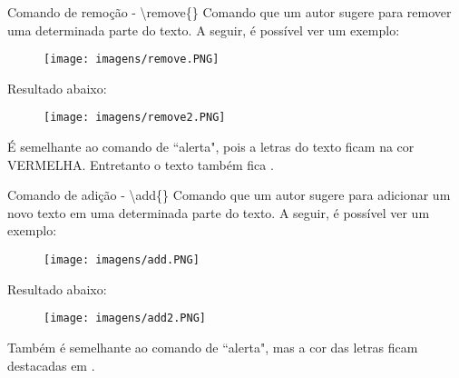 \documentclass[aspectratio=169,smaller]{beamer}
\begin{document}
\begin{frame}{Comando de remoção - \textbackslash remove\{\}}
\justifying
Comando que um autor sugere para remover uma determinada parte do texto. A seguir, é possível ver um exemplo:

\begin{figure}
        \centering
        \texttt{[image: imagens/remove.PNG]}
    \end{figure}

Resultado abaixo:

\begin{figure}
        \centering
        \texttt{[image: imagens/remove2.PNG]}
    \end{figure}

É semelhante ao comando de ``alerta", pois a letras do texto ficam na cor \alert{VERMELHA}. Entretanto o texto também fica .

\end{frame}
\begin{frame}{Comando de adição - \textbackslash add\{\}}
\justifying
Comando que um autor sugere para adicionar um novo texto em uma determinada parte do texto. A seguir, é possível ver um exemplo:

\begin{figure}
        \centering
        \texttt{[image: imagens/add.PNG]}
    \end{figure}

Resultado abaixo:

\begin{figure}
        \centering
        \texttt{[image: imagens/add2.PNG]}
    \end{figure}

Também é semelhante ao comando de ``alerta", mas a cor das letras ficam destacadas em .

\end{frame}
\end{document}
